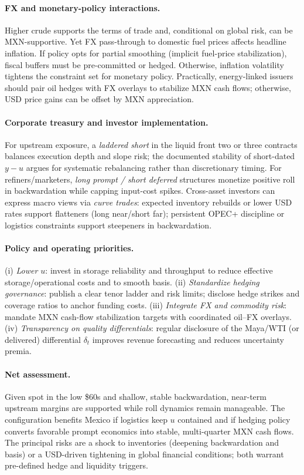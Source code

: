 \documentclass[10pt,a4paper]{article} %
\begin{document}
\paragraph{FX and monetary-policy interactions.}
Higher crude supports the terms of trade and, conditional on global risk, can be MXN-supportive. Yet FX pass-through to domestic fuel prices affects headline inflation. If policy opts for partial smoothing (implicit fuel-price stabilization), fiscal buffers must be pre-committed or hedged. Otherwise, inflation volatility tightens the constraint set for monetary policy. Practically, energy-linked issuers should pair oil hedges with FX overlays to stabilize MXN cash flows; otherwise, USD price gains can be offset by MXN appreciation.

\paragraph{Corporate treasury and investor implementation.}
For upstream exposure, a \emph{laddered short} in the liquid front two or three contracts balances execution depth and slope risk; the documented stability of short-dated \(y-u\) argues for systematic rebalancing rather than discretionary timing. For refiners/marketers, \emph{long prompt / short deferred} structures monetize positive roll in backwardation while capping input-cost spikes. Cross-asset investors can express macro views via \emph{curve trades}: expected inventory rebuilds or lower USD rates support flatteners (long near/short far); persistent OPEC+ discipline or logistics constraints support steepeners in backwardation.

\paragraph{Policy and operating priorities.}
(i) \emph{Lower \(u\)}: invest in storage reliability and throughput to reduce effective storage/operational costs and to smooth basis.  
(ii) \emph{Standardize hedging governance}: publish a clear tenor ladder and risk limits; disclose hedge strikes and coverage ratios to anchor funding costs.  
(iii) \emph{Integrate FX and commodity risk}: mandate MXN cash-flow stabilization targets with coordinated oil–FX overlays.  
(iv) \emph{Transparency on quality differentials}: regular disclosure of the Maya/WTI (or delivered) differential \(\delta_t\) improves revenue forecasting and reduces uncertainty premia.

\paragraph{Net assessment.}
Given spot in the low \$60s and shallow, stable backwardation, near-term upstream margins are supported while roll dynamics remain manageable. The configuration benefits Mexico if logistics keep \(u\) contained and if hedging policy converts favorable prompt economics into stable, multi-quarter MXN cash flows. The principal risks are a shock to inventories (deepening backwardation and basis) or a USD-driven tightening in global financial conditions; both warrant pre-defined hedge and liquidity triggers.
\end{document}
